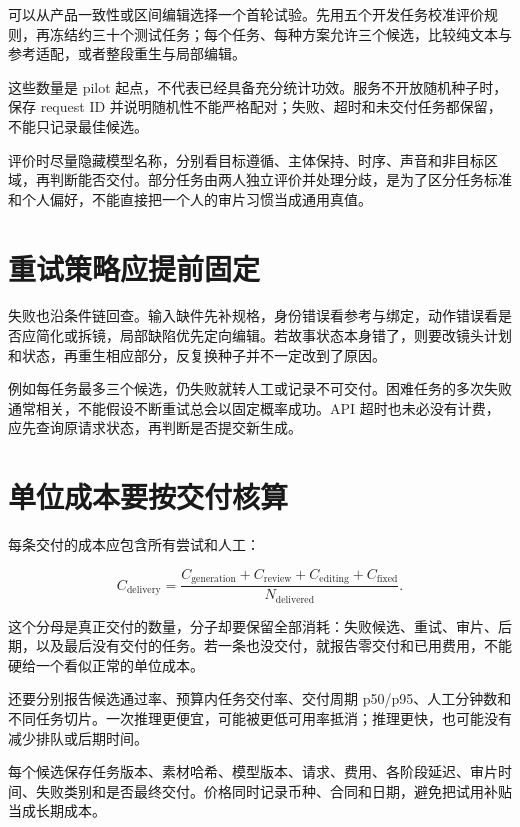 可以从产品一致性或区间编辑选择一个首轮试验。先用五个开发任务校准评价规则，再冻结约三十个测试任务；每个任务、每种方案允许三个候选，比较纯文本与参考适配，或者整段重生与局部编辑。

这些数量是 pilot 起点，不代表已经具备充分统计功效。服务不开放随机种子时，保存 request ID 并说明随机性不能严格配对；失败、超时和未交付任务都保留，不能只记录最佳候选。

评价时尽量隐藏模型名称，分别看目标遵循、主体保持、时序、声音和非目标区域，再判断能否交付。部分任务由两人独立评价并处理分歧，是为了区分任务标准和个人偏好，不能直接把一个人的审片习惯当成通用真值。

\section{重试策略应提前固定}\label{seedance-m14-ux91cdux8bd5ux7b56ux7565ux5e94ux63d0ux524dux56faux5b9a}

失败也沿条件链回查。输入缺件先补规格，身份错误看参考与绑定，动作错误看是否应简化或拆镜，局部缺陷优先定向编辑。若故事状态本身错了，则要改镜头计划和状态，再重生相应部分，反复换种子并不一定改到了原因。

例如每任务最多三个候选，仍失败就转人工或记录不可交付。困难任务的多次失败通常相关，不能假设不断重试总会以固定概率成功。API 超时也未必没有计费，应先查询原请求状态，再判断是否提交新生成。

\section{单位成本要按交付核算}\label{seedance-m14-ux5355ux4f4dux6210ux672cux8981ux6309ux4ea4ux4ed8ux6838ux7b97}

每条交付的成本应包含所有尝试和人工：

\[
C_{\mathrm{delivery}}=
\frac{C_{\mathrm{generation}}+C_{\mathrm{review}}+
C_{\mathrm{editing}}+C_{\mathrm{fixed}}}{N_{\mathrm{delivered}}}.
\]

这个分母是真正交付的数量，分子却要保留全部消耗：失败候选、重试、审片、后期，以及最后没有交付的任务。若一条也没交付，就报告零交付和已用费用，不能硬给一个看似正常的单位成本。

还要分别报告候选通过率、预算内任务交付率、交付周期 p50/p95、人工分钟数和不同任务切片。一次推理更便宜，可能被更低可用率抵消；推理更快，也可能没有减少排队或后期时间。

每个候选保存任务版本、素材哈希、模型版本、请求、费用、各阶段延迟、审片时间、失败类别和是否最终交付。价格同时记录币种、合同和日期，避免把试用补贴当成长期成本。

